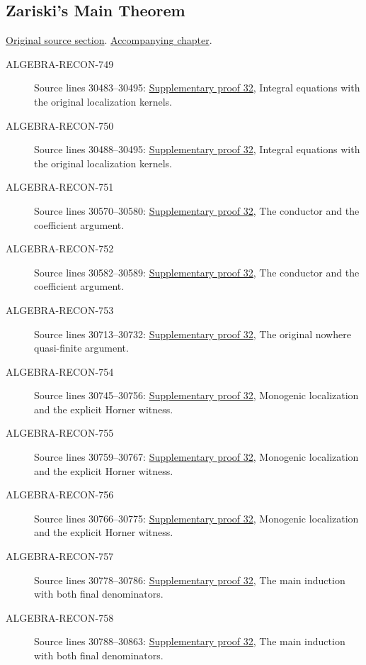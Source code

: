 \subsection{Zariski's Main Theorem}
\hypertarget{algebra-source-section-Zariski}{}
\noindent\href{https://github.com/stacks/stacks-project/blob/a04446e57ec1fbc252a871afcec7752fb2807b14/algebra.tex\#L30454}{Original source section}. \href{algebra.pdf\#nameddest=section-Zariski}{Accompanying chapter}.

\begin{description}
\item[ALGEBRA-RECON-749] Source lines 30483--30495: \hyperlink{algebra_zariski_main_notes_20260928}{Supplementary proof 32}, Integral equations with the original localization kernels.
\item[ALGEBRA-RECON-750] Source lines 30488--30495: \hyperlink{algebra_zariski_main_notes_20260928}{Supplementary proof 32}, Integral equations with the original localization kernels.
\item[ALGEBRA-RECON-751] Source lines 30570--30580: \hyperlink{algebra_zariski_main_notes_20260928}{Supplementary proof 32}, The conductor and the coefficient argument.
\item[ALGEBRA-RECON-752] Source lines 30582--30589: \hyperlink{algebra_zariski_main_notes_20260928}{Supplementary proof 32}, The conductor and the coefficient argument.
\item[ALGEBRA-RECON-753] Source lines 30713--30732: \hyperlink{algebra_zariski_main_notes_20260928}{Supplementary proof 32}, The original nowhere quasi-finite argument.
\item[ALGEBRA-RECON-754] Source lines 30745--30756: \hyperlink{algebra_zariski_main_notes_20260928}{Supplementary proof 32}, Monogenic localization and the explicit Horner witness.
\item[ALGEBRA-RECON-755] Source lines 30759--30767: \hyperlink{algebra_zariski_main_notes_20260928}{Supplementary proof 32}, Monogenic localization and the explicit Horner witness.
\item[ALGEBRA-RECON-756] Source lines 30766--30775: \hyperlink{algebra_zariski_main_notes_20260928}{Supplementary proof 32}, Monogenic localization and the explicit Horner witness.
\item[ALGEBRA-RECON-757] Source lines 30778--30786: \hyperlink{algebra_zariski_main_notes_20260928}{Supplementary proof 32}, The main induction with both final denominators.
\item[ALGEBRA-RECON-758] Source lines 30788--30863: \hyperlink{algebra_zariski_main_notes_20260928}{Supplementary proof 32}, The main induction with both final denominators.

\end{description}
